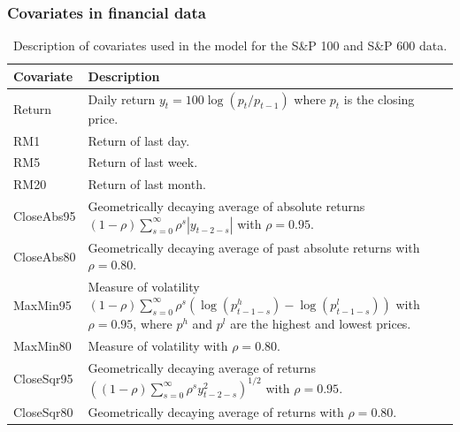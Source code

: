 \documentclass[10pt,aspectratio=43]{beamer}
\begin{document}
\begin{frame}
  \frametitle{Covariates in financial data}
  \begin{table}
  \begin{center}
    \caption{Description of covariates used in the model for the S\&P 100 and S\&P 600
      data.}
    \label{tab:sp-covariates}
    \begin{tabular}{lp{}l}
      \toprule
      Covariate & Description \\
      \midrule
      \textsf{Return}  & Daily return $y_{t}=100\log(p_{t}/p_{t-1})$ where $p_{t}$ is
                         the closing price. \\
      \textsf{RM1} & Return of last day. \\
      \textsf{RM5} & Return of last week. \\
      \textsf{RM20} & Return of last month. \\
      \textsf{CloseAbs95} & Geometrically decaying average of absolute returns
                            $(1-\rho)\sum\nolimits _{s=0}^{\infty}\rho^{s}|y_{t-2-s}|$
                            with $\rho=0.95$. \\
      \textsf{CloseAbs80} & Geometrically decaying average of past absolute returns
                            with $\rho=0.80$. \\
      \textsf{MaxMin95} & Measure of volatility $(1-\rho)\sum\nolimits
                          _{s=0}^{\infty}\rho^{s}(\log(p_{t-1-s}^{h})-\log(p_{t-1-s}^{l}))$
                          with $\rho=0.95$, where $p^{h}$ and $p^{l}$ are the highest and lowest prices.
      \\
      \textsf{MaxMin80} & Measure of volatility with $\rho=0.80$. \\
      \textsf{CloseSqr95} & Geometrically decaying average of returns
                            $((1-\rho)\sum\nolimits _{s=0}^{\infty}\rho^{s}y_{t-2-s}^{2})^{1/2}$ with
                            $\rho=0.95$. \\
      \textsf{CloseSqr80} & Geometrically decaying average of returns with
                            $\rho=0.80$. \\
      \bottomrule
    \end{tabular}
  \end{center}
\end{table}
\end{frame}
\end{document}

